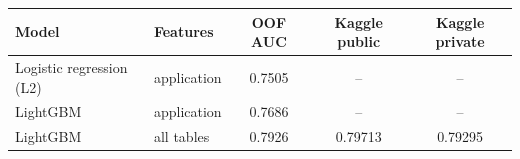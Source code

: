 \begin{tabular}{llccc}
\toprule
Model & Features & OOF AUC & Kaggle public & Kaggle private\\
\midrule
Logistic regression (L2) & application & 0.7505 & -- & --\\
LightGBM & application & 0.7686 & -- & --\\
LightGBM & all tables & 0.7926 & 0.79713 & 0.79295\\
\bottomrule
\end{tabular}

